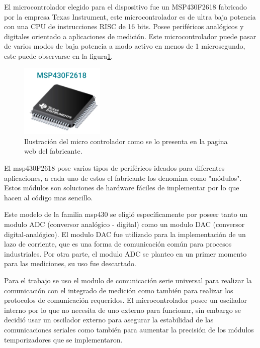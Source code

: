 
El microcontrolador elegido para el dispositivo fue un MSP430F2618 fabricado por la empresa Texas Instrument, este microcontrolador es de ultra baja potencia con una CPU de instrucciones RISC de 16 bits. Posee periféricos analógicos y digitales orientado a aplicaciones de medición. Este microcontrolador puede pasar de varios modos de baja potencia a modo activo en menos de 1 microsegundo, este puede observarse en la figura\ref{fig:msp430imagen}.

\begin{figure}[!h]
	\centering
	\includegraphics[width=40mm,keepaspectratio]{Figures/msp430F2618.png}
	\caption{Ilustración del micro controlador como se lo presenta en la pagina web del fabricante.}
	\label{fig:msp430imagen}
\end{figure}

El msp430F2618 pose varios tipos de periféricos ideados para diferentes aplicaciones, a cada uno de estos el fabricante los denomina como "módulos". Estos módulos son soluciones de hardware fáciles de implementar por lo que hacen al código mas sencillo. 

Este modelo de la familia msp430 se eligió específicamente por poseer tanto un modulo ADC (conversor analógico - digital) como un modulo DAC (conversor digital-analógico). El modulo DAC fue utilizado para la implementación de un lazo de corriente, que es una forma de comunicación común para procesos industriales. Por otra parte, el modulo  ADC se planteo en un primer momento para las mediciones, su uso fue descartado.  

Para el trabajo se uso el modulo de comunicación serie universal para realizar la comunicación con el integrado de medición como también para realizar los protocolos de comunicación requeridos. El microcontrolador posee un oscilador interno por lo que no necesita de uno externo para funcionar, sin embargo se decidió usar un oscilador externo para asegurar la estabilidad de las comunicaciones seriales como también para aumentar la precisión de los módulos temporizadores que se implementaron.

